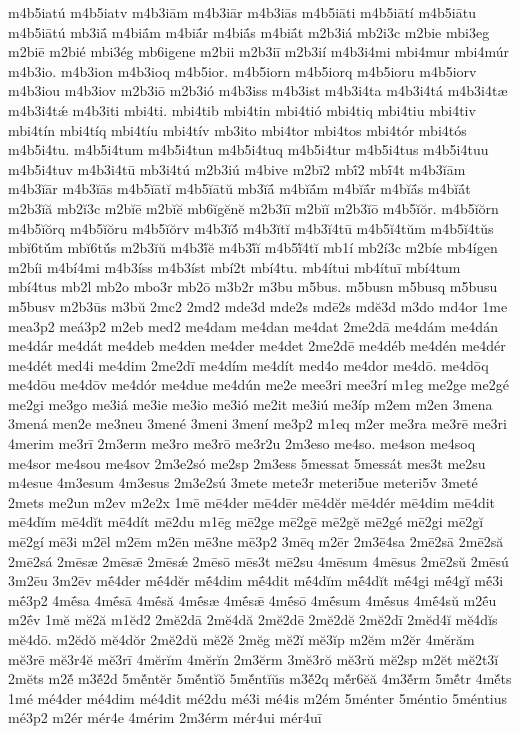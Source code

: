 {m4b5iatú
m4b5iatv
m4b3iām
m4b3iār
m4b3iās
m4b5iāti
m4b5iātí
m4b5iātu
m4b5iātú
mb3iā́
m4biā́m
m4biā́r
m4biā́s
m4biā́t
m2b3iá
mb2i3c
m2bie
mbi3eg
m2biē
m2bié
mbi3ég
mb6igene
m2bii
m2b3iī
m2b3ií
m4b3i4mi
mbi4mur
mbi4múr
m4b3io.
m4b3ion
m4b3ioq
m4b5ior.
m4b5iorn
m4b5iorq
m4b5ioru
m4b5iorv
m4b3iou
m4b3iov
m2b3iō
m2b3ió
m4b3iss
m4b3ist
m4b3i4ta
m4b3i4tá
m4b3i4tæ
m4b3i4tǽ
m4b3iti
mbi4ti.
mbi4tib
mbi4tin
mbi4tió
mbi4tiq
mbi4tiu
mbi4tiv
mbi4tín
mbi4tíq
mbi4tíu
mbi4tív
mb3ito
mbi4tor
mbi4tos
mbi4tór
mbi4tós
m4b5i4tu.
m4b5i4tum
m4b5i4tun
m4b5i4tuq
m4b5i4tur
m4b5i4tus
m4b5i4tuu
m4b5i4tuv
m4b3i4tū
mb3i4tú
m2b3iú
m4bive
m2bī2
mbī́2
mbī́4t
m4b3ĭām
m4b3ĭār
m4b3ĭās
m4b5ĭātĭ
m4b5ĭātŭ
mb3ĭā́
m4bĭā́m
m4bĭā́r
m4bĭā́s
m4bĭā́t
m2b3ĭă
mb2ĭ3c
m2bĭē
m2bĭĕ
mb6ĭgĕnĕ
m2b3ĭī
m2bĭĭ
m2b3ĭō
m4b5ĭŏr.
m4b5ĭŏrn
m4b5ĭŏrq
m4b5ĭŏru
m4b5ĭŏrv
m4b3ĭŏ́
m4b3ĭtĭ
m4b3ĭ4tū
m4b5ĭ4tŭm
m4b5ĭ4tŭs
mbĭ6tŭ́m
mbĭ6tŭ́s
m2b3ĭŭ
m4b3ĭ́ĕ
m4b3ĭ́ĭ
m4b5ĭ́4tĭ
mb1í
mb2í3c
m2bíe
mb4ígen
m2bíi
m4bí4mi
m4b3íss
m4b3íst
mbí2t
mbí4tu.
mb4ítui
mb4ítuī
mbí4tum
mbí4tus
mb2l
mb2o
mbo3r
mb2ō
m3b2r
m3bu
m5bus.
m5busn
m5busq
m5busu
m5busv
m2b3ūs
m3bŭ
2mc2
2md2
mde3d
mde2s
mdē2s
mdĕ3d
m3do
md4or
1me
mea3p2
meá3p2
m2eb
med2
me4dam
me4dan
me4dat
2me2dā
me4dám
me4dán
me4dár
me4dát
me4deb
me4den
me4der
me4det
2me2dē
me4déb
me4dén
me4dér
me4dét
med4i
me4dim
2me2dī
me4dím
me4dít
med4o
me4dor
me4dō.
me4dōq
me4dōu
me4dōv
me4dór
me4due
me4dún
me2e
mee3ri
mee3rí
m1eg
me2ge
me2gé
me2gi
me3go
me3iá
me3ie
me3io
me3ió
me2it
me3iú
me3íp
m2em
m2en
3mena
3mená
men2e
me3neu
3mené
3meni
3mení
me3p2
m1eq
m2er
me3ra
me3rē
me3ri
4merim
me3rī
2m3erm
me3ro
me3rō
me3r2u
2m3eso
me4so.
me4son
me4soq
me4sor
me4sou
me4sov
2m3e2só
me2sp
2m3ess
5messat
5messát
mes3t
me2su
m4esue
4m3esum
4m3esus
2m3e2sú
3mete
mete3r
meteri5ue
meteri5v
3meté
2mets
me2un
m2ev
m2e2x
1mē
mē4der
mē4dēr
mē4dĕr
mē4dér
mē4dim
mē4dit
mē4dĭm
mē4dĭt
mē4dít
mē2du
m1ēg
mē2ge
mē2gē
mē2gĕ
mē2gé
mē2gi
mē2gĭ
mē2gí
mē3i
m2ēl
m2ēm
m2ēn
mē3ne
mē3p2
3mēq
m2ēr
2m3ē4sa
2mē2sā
2mē2să
2mē2sá
2mēsæ
2mēsǣ
2mēsǽ
2mēsō
mēs3t
mē2su
4mēsum
4mēsus
2mē2sŭ
2mēsú
3m2ēu
3m2ēv
mḗ4der
mḗ4dĕr
mḗ4dim
mḗ4dit
mḗ4dĭm
mḗ4dĭt
mḗ4gi
mḗ4gĭ
mḗ3i
mḗ3p2
4mḗsa
4mḗsā
4mḗsă
4mḗsæ
4mḗsǣ
4mḗsō
4mḗsum
4mḗsus
4mḗ4sŭ
m2ḗu
m2ḗv
1mĕ
mĕ2ă
m1ĕd2
2mĕ2dā
2mĕ4dă
2mĕ2dē
2mĕ2dĕ
2mĕ2dī
2mĕd4ĭ
mĕ4dĭs
mĕ4dō.
m2ĕdŏ
mĕ4dŏr
2mĕ2dŭ
mĕ2ĕ
2mĕg
mĕ2ĭ
mĕ3ĭp
m2ĕm
m2ĕr
4mĕrăm
mĕ3rē
mĕ3r4ĕ
mĕ3rī
4mĕrĭm
4mĕrĭn
2m3ĕrm
3mĕ3rŏ
mĕ3rŭ
mĕ2sp
m2ĕt
mĕ2t3ĭ
2mĕts
m2ĕ́
m3ĕ́2d
5mĕ́ntĕr
5mĕ́ntĭŏ
5mĕ́ntĭŭs
m3ĕ́2q
mĕ́r6ĕă
4m3ĕ́rm
5mĕ́tr
4mĕ́ts
1mé
mé4der
mé4dim
mé4dit
mé2du
mé3i
mé4is
m2ém
5ménter
5méntio
5méntius
mé3p2
m2ér
mér4e
4mérim
2m3érm
mér4ui
mér4uī
}
